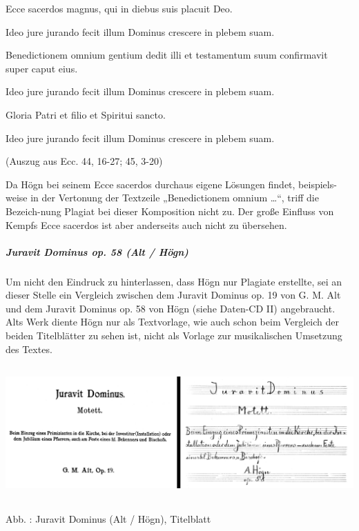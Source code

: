 \documentclass[a4paper]{article}
\newcounter{Abb}
\renewcommand\theAbb{\arabic{Abb}}
\begin{document}
Ecce sacerdos magnus, qui in diebus suis placuit Deo.

Ideo jure jurando fecit illum Dominus crescere in plebem suam.

Benedictionem omnium gentium dedit illi et testamentum suum confirmavit
super caput eius.

Ideo jure jurando fecit illum Dominus crescere in plebem suam.

Gloria Patri et filio et Spiritui sancto.

Ideo jure jurando fecit illum Dominus crescere in plebem suam.

(Auszug aus Ecc. 44, 16-27; 45, 3-20)

Da Högn bei seinem Ecce sacerdos durchaus eigene Lösungen findet,
beispiels-weise in der Vertonung der Textzeile „Benedictionem omnium
…“, triff die Bezeich-nung Plagiat bei dieser Komposition nicht zu. Der
große Einfluss von Kempfs Ecce sacerdos ist aber anderseits auch nicht
zu übersehen.

\clearpage\subparagraph{Juravit Dominus op. 58 (Alt / Högn)}
Um nicht den Eindruck zu hinterlassen, dass Högn nur Plagiate erstellte,
sei an dieser Stelle ein Vergleich zwischen dem Juravit Dominus op. 19
von G. M. Alt und dem Juravit Dominus op. 58 von Högn (siehe Daten-CD
II) angebraucht. Alts Werk diente Högn nur als Textvorlage, wie auch
schon beim Vergleich der beiden Titelblätter zu sehen ist, nicht als
Vorlage zur musikalischen Umsetzung des Textes.


\includegraphics[width=15.977cm,height=5.128cm]{pictures/zulassungsarbeit-img088.png}


Abb. \stepcounter{Abb}{\theAbb}: Juravit Dominus (Alt / Högn),
Titelblatt
\end{document}
